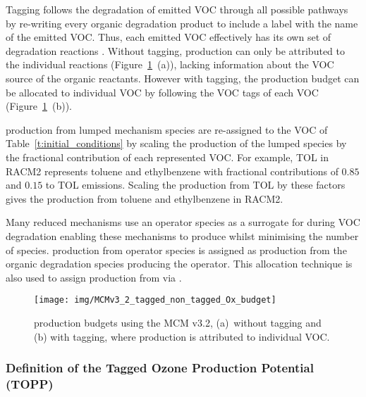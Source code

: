 Tagging follows the degradation of emitted VOC through all possible pathways by re-writing every organic degradation product to include a label with the name of the emitted VOC.
Thus, each emitted VOC effectively has its own set of degradation reactions \citep{Butler:2011}.
Without tagging,  production can only be attributed to the individual reactions \mbox{(Figure \ref{f:Ox_budget} (a))}, lacking information about the VOC source of the organic reactants.
However with tagging, the  production budget can be allocated to individual VOC by following the VOC tags of each VOC \mbox{(Figure \ref{f:Ox_budget} (b)).}

 production from lumped mechanism species are re-assigned to the VOC of \mbox{Table \ref{t:initial_conditions}} by scaling the  production of the lumped species by the fractional contribution of each represented VOC.
For example, TOL in RACM2 represents toluene and ethylbenzene with fractional contributions of $0.85$ and $0.15$ to TOL emissions.
Scaling the  production from TOL by these factors gives the  production from toluene and ethylbenzene in RACM2.

Many reduced mechanisms use an operator species as a surrogate for  during VOC degradation enabling these mechanisms to produce  whilst minimising the number of  species.
 production from operator species is assigned as  production from the organic degradation species producing the operator.
This allocation technique is also used to assign  production from  via .

\begin{figure}
    \centering
    \texttt{[image: img/MCMv3\_2\_tagged\_non\_tagged\_Ox\_budget]}
    \vspace{0mm}
    \caption{ production budgets using the MCM v3.2, \mbox{(a) without} tagging and (b) with tagging, where  production is attributed to individual VOC.}
    \vspace{-4mm}
    \label{f:Ox_budget}
\end{figure} 

\subsubsection{Definition of the Tagged Ozone Production Potential (TOPP)} \label{sss:TOPP} %

